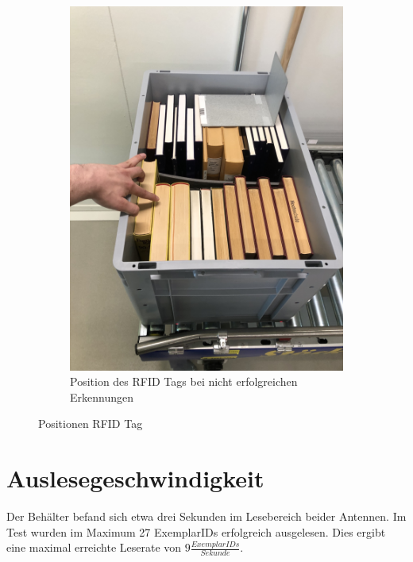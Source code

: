 \documentclass[parskip=full, a4paper]{scrartcl}
\begin{document}
\begin{figure}[htb]
\begin{subfigure}{0.48\linewidth}
		\includegraphics[keepaspectratio,width=\linewidth]{img/RFIDPositionNichtErfolgreich.jpg}
		\caption{Position des RFID Tags bei nicht erfolgreichen Erkennungen}
	\end{subfigure}
	\caption{Positionen RFID Tag}
	\label{fig:PositionenRFIDTag}
\end{figure}

\section{Auslesegeschwindigkeit}
Der Behälter befand sich etwa drei Sekunden im Lesebereich beider Antennen. Im Test wurden im Maximum 27 ExemplarIDs erfolgreich ausgelesen. Dies ergibt eine maximal erreichte Leserate von $9 \frac{ExemplarIDs}{Sekunde}$.

\clearpage
\end{document}
